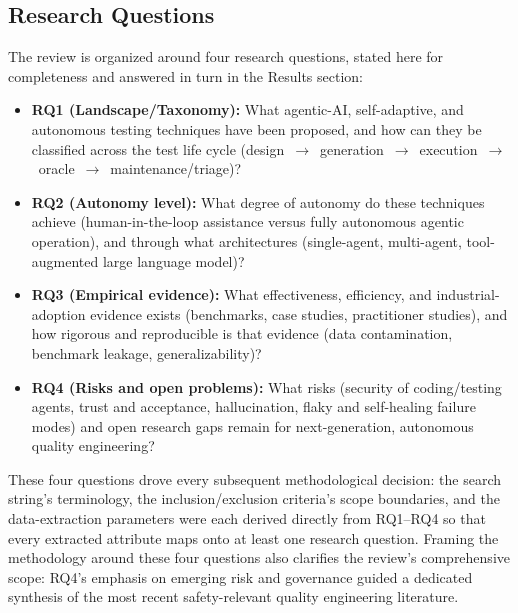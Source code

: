 \subsection{Research Questions}
\label{subsec:methodology-rqs}
The review is organized around four research questions, stated here
for completeness and answered in turn in the Results section:
\begin{itemize}
  \item \textbf{RQ1 (Landscape/Taxonomy):} What agentic-AI, self-adaptive, and
        autonomous testing techniques have been proposed, and how can they be
        classified across the test life cycle (design~$\rightarrow$~generation~$\rightarrow$~execution~$\rightarrow$~oracle~$\rightarrow$~maintenance/triage)?
  \item \textbf{RQ2 (Autonomy level):} What degree of autonomy do these
        techniques achieve (human-in-the-loop assistance versus fully
        autonomous agentic operation), and through what architectures
        (single-agent, multi-agent, tool-augmented large language model)?
  \item \textbf{RQ3 (Empirical evidence):} What effectiveness, efficiency, and
        industrial-adoption evidence exists (benchmarks, case studies,
        practitioner studies), and how rigorous and reproducible is that
        evidence (data contamination, benchmark leakage, generalizability)?
  \item \textbf{RQ4 (Risks and open problems):} What risks (security of
        coding/testing agents, trust and acceptance, hallucination, flaky and
        self-healing failure modes) and open research gaps remain for
        next-generation, autonomous quality engineering?
\end{itemize}
These four questions drove every subsequent methodological decision: the search string's
terminology, the inclusion/exclusion criteria's scope boundaries, and
the data-extraction parameters were each derived directly from
RQ1--RQ4 so that every extracted attribute maps onto at least one research
question. Framing the methodology around these four questions also
clarifies the review's comprehensive scope: RQ4's emphasis on emerging risk and governance
guided a dedicated synthesis of the most recent safety-relevant quality engineering literature.


